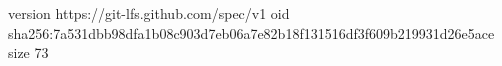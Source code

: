 version https://git-lfs.github.com/spec/v1
oid sha256:7a531dbb98dfa1b08c903d7eb06a7e82b18f131516df3f609b219931d26e5ace
size 73
